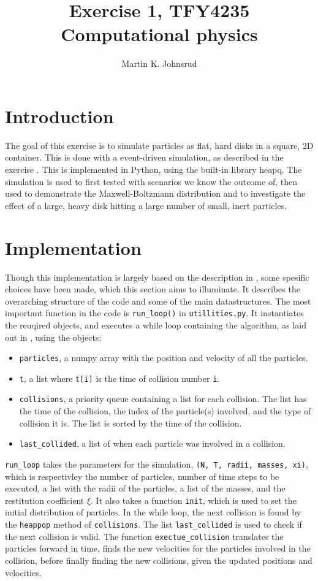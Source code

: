 \documentclass{article}
\title{Exercise 1, TFY4235 Computational physics}
\author{Martin K. Johnsrud}
\date{}
\begin{document}
    \maketitle
    \section*{Introduction}
    The goal of this exercise is to simulate particles as flat, hard disks in a square, 2D container. This is done with a event-driven simulation, as described in the exercise \cite{exercise}. This is implemented in Python, using the built-in library heapq. The simulation is used to first tested with scenarios we know the outcome of, then used to demonstrate the Maxwell-Boltzmann distribution and to investigate the effect of a large, heavy disk hitting a large number of small, inert particles.

    \section*{Implementation}
    Though this implementation is largely based on the description in \cite{exercise}, some spesific choices have been made, which this section aims to illuminate. It describes the overarching structure of the code and some of the main datastructures. The most important function in the code is \verb|run_loop()| in \verb|utillities.py|. It instantiates the reuqired objects, and executes a while loop containing the algorithm, as laid out in \cite{exercise}, using the objects:
    \begin{itemize}
        \item \verb|particles|, a numpy array with the position and velocity of all the particles.
        \item \verb|t|, a list where \verb|t[i]| is the time of collision number \verb|i|.
        \item \verb|collisions|, a priority queue containing a list for each collision. The list has the time of the collision, the index of the particle(s) involved, and the type of collision it is. The list is sorted by the time of the collision.
        \item \verb|last_collided|, a list of when each particle was involved in a collision.
    \end{itemize}
    \verb|run_loop| takes the parameters for the simulation, \verb|(N, T, radii, masses, xi)|, which is respectivley the number of particles, number of time steps to be executed, a list with the radii of the particles, a list of the masses, and the restitution coefficient $\xi$. It also takes a function \verb|init|, which is used to set the initial distribution of particles. In the while loop, the next collision is found by the \verb|heappop| method of \verb|collisions|. The list \verb|last_collided| is used to check if the next collision is valid. The function \verb|exectue_collision| translates the particles forward in time, finds the new velocities for the particles involved in the collision, before finally finding the new collisions, given the updated positions and velocities. 
    
\end{document}
